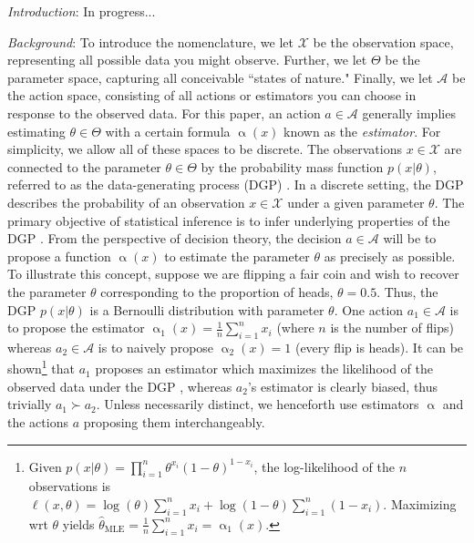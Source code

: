 \documentclass[letterpaper,12pt]{article}
\newcommand{\given}{|}
\begin{document}
	\doublespacing
	
\textit{Introduction}: In progress...

\textit{Background}: To introduce the nomenclature, we let $\mathcal{X}$ be the observation space, representing all possible data you might observe. Further, we let ${\Theta}$ be the parameter space, capturing all conceivable ``states of nature." Finally, we let $\mathcal{A}$ be the action space, consisting of all actions or estimators you can choose in response to the observed data. For this paper, an action $a \in \mathcal{A}$ generally implies estimating $\theta \in \Theta$ with a certain formula $\upalpha(x)$ known as the \textit{estimator}.  For simplicity, we allow all of these spaces to be discrete.  The observations $x \in \mathcal{X}$ are connected to the parameter $\theta \in \Theta$ by the probability mass function $p(x \given \theta)$, referred to as the data-generating process (DGP) \cite{tu2004data}. In a discrete setting, the DGP describes the probability of an observation $x \in \mathcal{X}$ under a given parameter $\theta$. The primary objective of statistical inference is to infer underlying properties of the DGP \cite{upton2008oxford}. From the perspective of decision theory, the decision $a \in \mathcal{A}$ will be to propose a function $\upalpha(x)$ to estimate the parameter $\theta$ as precisely as possible. To illustrate this concept, suppose we are flipping a fair coin and wish to recover the parameter $\theta$ corresponding to the proportion of heads, $\theta = 0.5$. Thus, the DGP $p(x \given \theta)$ is a Bernoulli distribution with parameter $\theta$. One action $a_1 \in \mathcal{A}$ is to propose the estimator $\upalpha_1(x) = \frac{1}{n}\sum_{i = 1}^n x_i$ (where $n$ is the number of flips) whereas $a_2 \in \mathcal{A}$ is to naively propose $\upalpha_2 (x) = 1$ (every flip is heads). It can be shown\footnote{ Given $p(x\given \theta) = \prod_{i = 1}^n\theta^{x_i}(1-\theta)^{1-x_i}$, the log-likelihood of the $n$ observations is $\ell(x, \theta) = \log(\theta) \sum_{i = 1}^n x_i + \log(1 - \theta) \sum_{i = 1}^n (1 - x_i)$. Maximizing wrt $\theta$ yields $\hat{\theta}_{\text{MLE}} = \frac{1}{n}\sum_{i = 1}^n x_i = \upalpha_1(x)$.} that $a_1$ proposes an estimator which maximizes the likelihood of the observed data under the DGP \cite{rossi2018}, whereas $a_2$'s estimator is clearly biased, thus trivially $a_1 \succ a_2$. Unless necessarily distinct, we henceforth use estimators $\upalpha$ and the actions $a$ proposing them interchangeably. 
\end{document}
